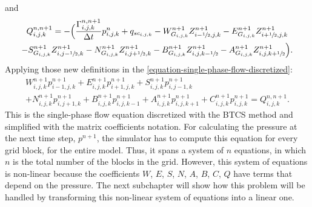 %
and
%
\begin{multline}
	Q_{i,j,k}^{n,n+1}=-\Big(\frac{\Gamma_{i,j,k}^{n,n+1}}{\Delta t}p_{i,j,k}^n+ q_{sc_{i,j,k}} - W_{G_{i,j,k}}^{n+1}Z_{i-\sfrac{1}{2},j,k}^{n+1}-E_{G_{i,j,k}}^{n+1}Z_{i+\sfrac{1}{2},j,k}^{n+1}\\-S_{G_{i,j,k}}^{n+1}Z_{i,j-\sfrac{1}{2},k}^{n+1}-N_{G_{i,j,k}}^{n+1}Z_{i,j+\sfrac{1}{2},k}^{n+1}-B_{G_{i,j,k}}^{n+1}Z_{i,j,k-\sfrac{1}{2}}^{n+1}-A_{G_{i,j,k}}^{n+1}Z_{i,j,k+\sfrac{1}{2}}^{n+1}\Big).
\end{multline}
%
Applying those new definitions in the \ref{equation-single-phase-flow-discretized}:
%
\begin{multline}
	\label{equation-single-phase-flow-discretized-matrix-notation}
	W^{n+1}_{i,j,k}p^{n+1}_{i-1,j,k}+E^{n+1}_{i,j,k}p^{n+1}_{i+1,j,k}+S^{n+1}_{i,j,k}p^{n+1}_{i,j-1,k}\\+N^{n+1}_{i,j,k}p^{n+1}_{i,j+1,k}+B^{n+1}_{i,j,k}p^{n+1}_{i,j,k-1}+A^{n+1}_{i,j,k}p^{n+1}_{i,j,k+1}+C^{n+1}_{i,j,k}p^{n+1}_{i,j,k}=Q^{n, n+1}_{i,j,k}.
\end{multline}
%
This is the single-phase flow equation discretized with the BTCS method and simplified with the \cite{Ertekin2001} matrix coefficients notation.
%
For calculating the pressure at the next time step, $p^{n + 1}$, the simulator has to compute this equation for every grid block, for the entire model.
%
Thus, it spans a system of $n$ equations, in which $n$ is the total number of the blocks in the grid.
%
However, this system of equations is non-linear because the coefficients $W$, $E$, $S$, $N$, $A$, $B$, $C$, $Q$ have terms that depend on the pressure.
%
The next subchapter will show how this problem will be handled by transforming this non-linear system of equations into a linear one.

